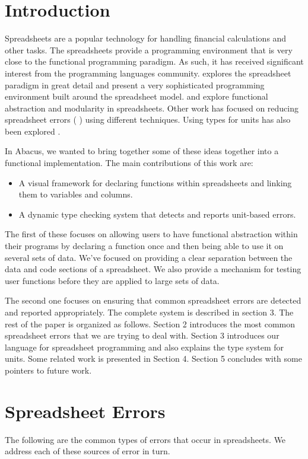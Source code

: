 \documentclass{acm_proc_article-sp}
\begin{document}
\section{Introduction}
Spreadsheets are a popular technology for handling financial calculations and other tasks. The spreadsheets provide
a programming environment that is very close to the functional programming paradigm. As such, it has received
significant interest from the programming languages community. \cite{forms/3} explores the spreadsheet paradigm in
 great detail and present a very sophisticated programming environment built around the spreadsheet
model. \cite{Wakeling:2007:SFP:1194875.1194878} and \cite{Sestoft} explore functional abstraction and modularity
in spreadsheets. Other work has focused on reducing spreadsheet errors (\cite{Coblenz05usingobjects} \cite{Panko98whatwe}) using different
techniques. Using types for units has also been explored \cite{DBLP:conf/cefp/Kennedy09}. 

In Abacus, we wanted to bring together some of these ideas together into a functional implementation. The main contributions of this work are:

\begin{itemize}
\item A visual framework for declaring functions within spreadsheets and linking them to variables and columns.
\item A dynamic type checking system that detects and reports unit-based errors.
\end{itemize}

The first of these focuses on allowing users to have functional abstraction within their programs by declaring a function once and then being able to use it on several sets of data. We've focused on providing a clear separation between the data and code sections of a spreadsheet. We also provide a mechanism for testing user functions before they are applied to large sets of data.

The second one focuses on ensuring that common spreadsheet errors are detected and reported appropriately. The complete system is described in section 3. The rest of the paper is organized as follows. Section 2 introduces the most common spreadsheet errors that we are trying to deal with. Section 3 introduces our language for spreadsheet programming and also explains the type system for units. Some related work is presented in Section 4. Section 5 concludes with some pointers to future work.


\section{Spreadsheet Errors}
The following are the common types of errors that occur in
spreadsheets.  We address each of these sources of error in turn.
\end{document}
